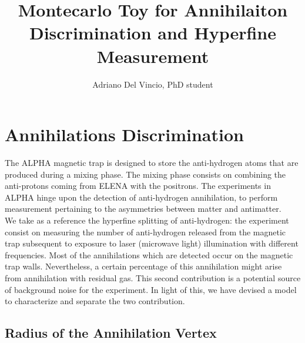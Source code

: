 \documentclass[11pt,a4paper,twocolumn]{article}
\title{\vspace{-2.0cm}Montecarlo Toy for Annihilaiton Discrimination and Hyperfine Measurement}
\author{Adriano Del Vincio, PhD student}
\begin{document}



\section*{Annihilations Discrimination}

The ALPHA magnetic trap is designed to store the anti-hydrogen atoms that are produced during a mixing phase. The mixing phase consists on combining the anti-protons coming from ELENA with the positrons. 
The experiments in ALPHA hinge upon the detection of anti-hydrogen annihilation, to perform measurement pertaining to the asymmetries between matter and antimatter.\\
We take as a reference the hyperfine splitting of anti-hydrogen: the experiment consist on measuring the number of anti-hydrogen released from the magnetic trap subsequent to exposure to laser (microwave light) illumination with different frequencies. Most of the annihilations which are detected occur on the magnetic trap walls. Nevertheless, a certain percentage of this annihilation might arise from annihilation with residual gas. This second contribution is a potential source of background noise for the experiment. In light of this, we have devised a model to characterize and separate the two contribution.
\subsection*{Radius of the Annihilation Vertex}
\end{document}
